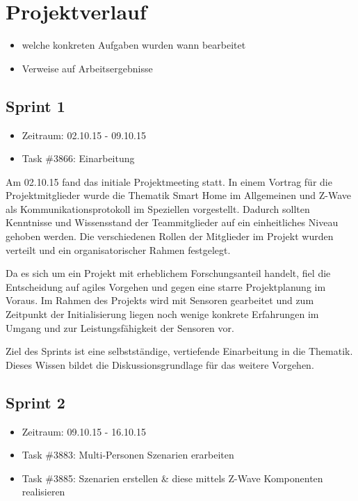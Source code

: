\documentclass[12pt, oneside, smallheadings]{scrbook}
\begin{document}
\chapter{Projektverlauf}
\begin{itemize}
	\item welche konkreten Aufgaben wurden wann bearbeitet
	\item Verweise auf Arbeitsergebnisse
\end{itemize}

\section{Sprint 1}
\begin{itemize}
	\item Zeitraum: 02.10.15 - 09.10.15
	\item Task \#3866: Einarbeitung
\end{itemize}
Am 02.10.15 fand das initiale Projektmeeting statt. In einem Vortrag für die Projektmitglieder wurde die Thematik Smart Home im Allgemeinen und Z-Wave als Kommunikationsprotokoll im Speziellen vorgestellt. Dadurch sollten Kenntnisse und Wissensstand der Teammitglieder auf ein einheitliches Niveau gehoben werden. Die verschiedenen Rollen der Mitglieder im Projekt wurden verteilt und ein organisatorischer Rahmen festgelegt.

Da es sich um ein Projekt mit erheblichem Forschungsanteil handelt, fiel die Entscheidung auf agiles Vorgehen und gegen eine starre Projektplanung im Voraus. Im Rahmen des Projekts wird mit Sensoren gearbeitet und zum Zeitpunkt der Initialisierung liegen noch wenige konkrete Erfahrungen im Umgang und zur Leistungsfähigkeit der Sensoren vor.

Ziel des Sprints ist eine selbstständige, vertiefende Einarbeitung in die Thematik. Dieses Wissen bildet die Diskussionsgrundlage für das weitere Vorgehen.

\section{Sprint 2}
\begin{itemize}
	\item Zeitraum: 09.10.15 - 16.10.15
	\item Task \#3883: Multi-Personen Szenarien erarbeiten
	\item Task \#3885: Szenarien erstellen \& diese mittels Z-Wave Komponenten realisieren
\end{itemize}
\end{document}
